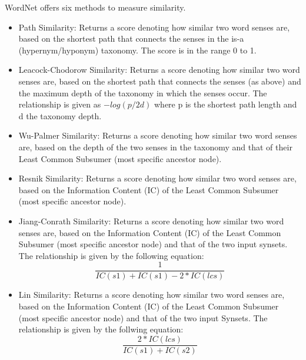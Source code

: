 \documentclass{article}
\begin{document}
WordNet offers six methods to measure similarity\cite{pedersen2004wordnet}. %
\begin{itemize}
	\item Path Similarity: Returns a score denoting how similar two word senses are, based on the shortest path that connects the senses in the is-a (hypernym/hyponym) taxonomy. The score is in the range 0 to 1. %
	\item Leacock-Chodorow Similarity: Returns a score denoting how similar two word senses are, based on the shortest path that connects the senses (as above) and the maximum depth of the taxonomy in which the senses occur. The relationship is given as \(-log(p/2d)\) where p is the shortest path length and d the taxonomy depth. %
	\item Wu-Palmer Similarity: Returns a score denoting how similar two word senses are, based on the depth of the two senses in the taxonomy and that of their Least Common Subsumer (most specific ancestor node). %
	\item Resnik Similarity: Returns a score denoting how similar two word senses are, based on the Information Content (IC) of the Least Common Subsumer (most specific ancestor node). %
	\item Jiang-Conrath Similarity: Returns a score denoting how similar two word senses are, based on the Information Content (IC) of the Least Common Subsumer (most specific ancestor node) and that of the two input synsets. The relationship is given by the following equation:
\begin{equation} \label{eq:jcnsimilarity}
	\frac{1} {IC(s1) + IC(s1) - 2 * IC(lcs)}
\end{equation}
	\item Lin Similarity: Returns a score denoting how similar two word senses are, based on the Information Content (IC) of the Least Common Subsumer (most specific ancestor node) and that of the two input Synsets. The relationship is given by the follwing equation:
\begin{equation} \label{eq:linsimilarity}
	\frac{2 * IC(lcs)} {IC(s1) + IC(s2)} 
\end{equation} 
\end{itemize}
\end{document}
